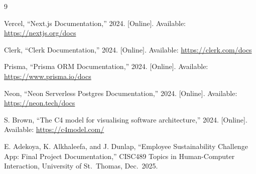 \documentclass[11pt]{article}
\begin{document}
\begin{thebibliography}{9}

Vercel, ``Next.js Documentation,'' 2024. [Online]. Available:
\url{https://nextjs.org/docs}

Clerk, ``Clerk Documentation,'' 2024. [Online]. Available:
\url{https://clerk.com/docs}

Prisma, ``Prisma ORM Documentation,'' 2024. [Online]. Available:
\url{https://www.prisma.io/docs}

Neon, ``Neon Serverless Postgres Documentation,'' 2024. [Online]. Available:
\url{https://neon.tech/docs}

S. Brown, ``The C4 model for visualising software architecture,'' 2024.
[Online]. Available: \url{https://c4model.com/}

E. Adekoya, K. Alkhaleefa, and J. Dunlap, ``Employee Sustainability Challenge
App: Final Project Documentation,'' CISC489 Topics in Human-Computer
Interaction, University of St.\ Thomas, Dec.\ 2025.

\end{thebibliography}
\end{document}
